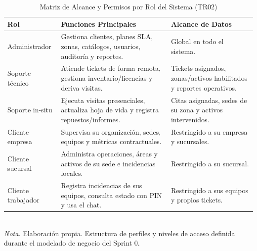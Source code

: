 \vspace{-0.4em}

\begin{table}[H]
\centering
\footnotesize
\renewcommand{\arraystretch}{1.08}
\caption{Matriz de Alcance y Permisos por Rol del Sistema (TR02)}
\label{tab:evidencia_tr02}
\begin{tabular}{@{} >{\raggedright\arraybackslash}p{3.2cm} >{\raggedright\arraybackslash}p{6.8cm} >{\raggedright\arraybackslash}p{4.8cm} @{}}
\toprule
\textbf{Rol} & \textbf{Funciones Principales} & \textbf{Alcance de Datos} \\
\midrule
Administrador & Gestiona clientes, planes SLA, zonas, catálogos, usuarios, auditoría y reportes. & Global en todo el sistema. \\
Soporte técnico & Atiende tickets de forma remota, gestiona inventario/licencias y deriva visitas. & Tickets asignados, zonas/activos habilitados y reportes operativos. \\
Soporte in-situ & Ejecuta visitas presenciales, actualiza hoja de vida y registra repuestos/informes. & Citas asignadas, sedes de su zona y activos intervenidos. \\
Cliente empresa & Supervisa su organización, sedes, equipos y métricas contractuales. & Restringido a su empresa y sucursales. \\
Cliente sucursal & Administra operaciones, áreas y activos de su sede e incidencias locales. & Restringido a su sucursal. \\
Cliente trabajador & Registra incidencias de sus equipos, consulta estado con PIN y usa el chat. & Restringido a sus equipos y propios tickets. \\
\bottomrule
\end{tabular}
\\[0.15em]
{\scriptsize \textit{Nota.} Elaboración propia. Estructura de perfiles y niveles de acceso definida durante el modelado de negocio del Sprint 0.}
\end{table}

